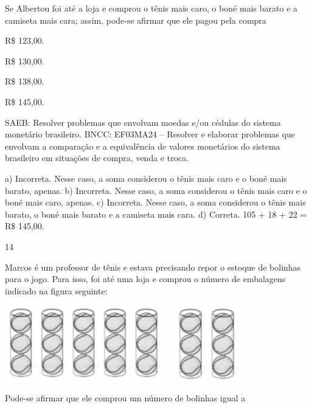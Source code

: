 \begin{multicols}{2}
\begin{enumerate}
{Se Albertou foi até a loja e comprou o tênis mais caro, o boné mais barato e a camiseta mais cara; assim, pode-se afirmar que ele pagou pela compra

\begin{escolha}

\item
  R\$ 123,00.
\item
  R\$ 130,00.
\item
  R\$ 138,00.
\item
  R\$ 145,00.
\end{escolha}

SAEB: Resolver problemas que envolvam moedas e/ou cédulas do sistema monetário brasileiro.
BNCC: EF03MA24 -- Resolver e elaborar problemas que envolvam a comparação e a equivalência de
valores monetários do sistema brasileiro em situações de compra, venda e troca.

a) Incorreta. Nesse caso, a soma considerou o tênis mais caro e o boné mais barato, apenas.
b) Incorreta. Nesse caso, a soma considerou o tênis mais caro e o boné mais caro, apenas.
c) Incorreta. Nesse caso, a soma considerou o tênis mais barato, o boné mais barato e a camiseta mais cara.
d) Correta. 105 + 18 + 22 = R\$ 145,00.

\num{14}

Marcos é um professor de tênis e estava precisando repor o estoque de bolinhas para o jogo. Para isso, foi até uma loja e comprou o número de embalagens indicado na figura seguinte:


\includegraphics[width=2.80882in,height=1.29243in]{media/image139.png}
\includegraphics[width=1.18628in,height=1.28713in]{media/image140.png}

Pode-se afirmar que ele comprou um número de bolinhas igual a

}
\end{enumerate}
\end{multicols}
